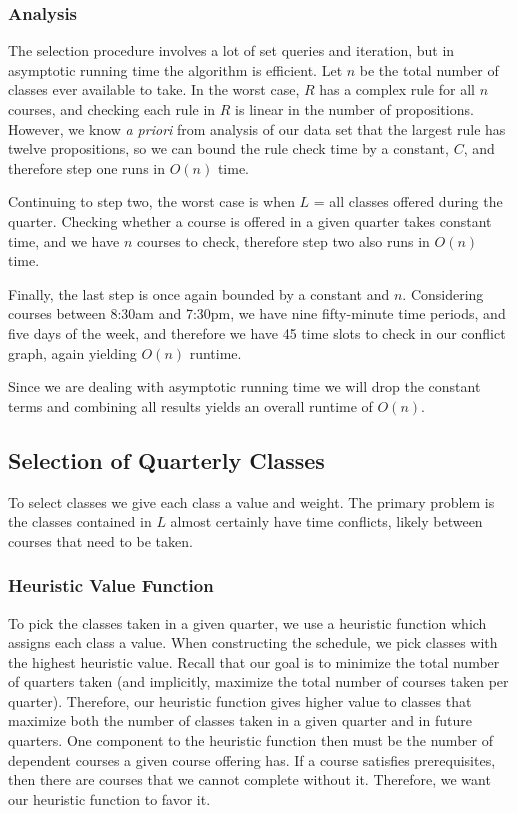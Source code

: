 \documentclass[11pt]{article} %
\begin{document}
\subsubsection{Analysis} The selection procedure involves a lot of set queries
and iteration, but in asymptotic running time the algorithm is efficient.
Let $n$ be the total number of classes ever available to take.
In the worst case, $R$ has a complex rule for all $n$
courses, and checking each rule in $R$ is linear in the number of propositions.
However, we know {\it a priori} from analysis of our data set that the largest
rule has twelve propositions, so we can bound the rule check time by a constant,
$C$, and therefore step one runs in $O(n)$ time.

Continuing to step two, the worst case is when $L$ = {all classes offered during
the quarter}.  Checking whether a course is offered in a given quarter takes
constant time, and we have $n$ courses to check, therefore step two also
runs in $O(n)$ time.

Finally, the last step is once again bounded by a constant and $n$.  Considering
courses between 8:30am and 7:30pm, we have nine fifty-minute time periods, and
five days of the week, and therefore we have 45 time slots to check in our
conflict graph, again yielding $O(n)$ runtime.

Since we are dealing with asymptotic running time we will drop the constant
terms and combining all results yields an overall runtime of $O(n)$.

\subsection{Selection of Quarterly Classes} To select classes we give each class
a value and weight.  The primary problem is the classes contained in $L$
almost certainly have time conflicts, likely between courses that need to be
taken.  

\subsubsection{Heuristic Value Function} To pick the classes taken in a given quarter,
we use a heuristic function which assigns
each class a value.  When constructing the schedule, we pick classes with the
highest heuristic value.  Recall that our goal is to minimize the total number
of quarters taken (and implicitly, maximize the total number of courses taken
per quarter).  Therefore, our heuristic function gives higher value to classes
that maximize both the number of classes taken in a given quarter and in future
quarters.  One component to the heuristic function then must be the number of
dependent courses a given course offering has.  If a course satisfies
prerequisites, then there are courses that we cannot complete without it.
Therefore, we want our heuristic function to favor it.
\end{document}
